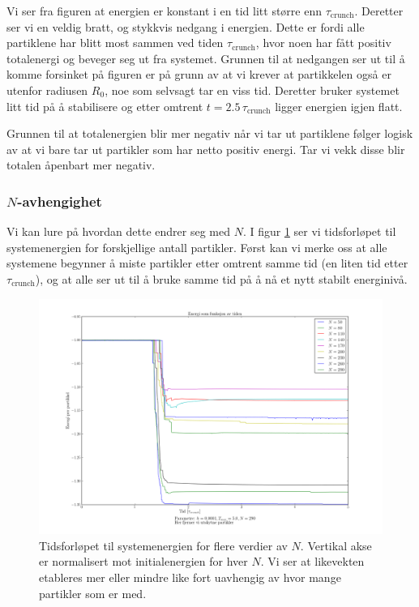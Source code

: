 \documentclass[11pt]{article}
\begin{document}
\begin{multicols}{2}
Vi ser fra figuren at energien er konstant i en tid litt større enn
$\tau_\text{crunch}$. Deretter ser vi en veldig bratt, og stykkvis
nedgang i energien. Dette er fordi alle partiklene har blitt most
sammen ved tiden $\tau_\text{crunch}$, hvor noen har fått positiv
totalenergi og beveger seg ut fra systemet. Grunnen til at nedgangen
ser ut til å komme forsinket på figuren er på grunn av at vi
krever at partikkelen også er utenfor radiusen $R_0$, noe som selvsagt
tar en viss tid. Deretter bruker systemet litt tid på å stabilisere
og etter omtrent $t = 2.5\,\tau_\text{crunch}$ ligger energien igjen
flatt. 

Grunnen til at totalenergien blir mer negativ når vi tar ut partiklene
følger logisk av at vi bare tar ut partikler som har netto positiv
energi. Tar vi vekk disse blir totalen åpenbart mer negativ. 


\subsubsection{$N$-avhengighet}
Vi kan lure på hvordan dette endrer seg med $N$. I figur
\ref{fig:energy-many-N} ser vi tidsforløpet til systemenergien for
forskjellige antall partikler. Først kan vi merke oss at alle
systemene begynner å miste partikler etter omtrent samme tid (en liten
tid etter $\tau_\text{crunch}$), og at alle ser ut til å bruke samme
tid på å nå et nytt stabilt energinivå. 

\end{multicols}
\begin{figure}[!ht]
  \centering
  \includegraphics[width=\textwidth]{../fig/energy_plot_with_ejection_many_N.png}
  \caption{\label{fig:energy-many-N} Tidsforløpet til systemenergien
    for flere verdier av $N$. Vertikal akse er normalisert mot
    initialenergien for hver $N$. Vi ser at likevekten etableres mer eller
  mindre like fort uavhengig av hvor mange partikler som er med.}
\end{figure}
\end{document}
